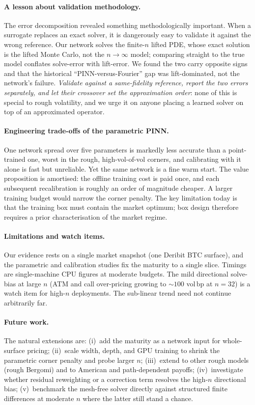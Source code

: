 \documentclass[review,12pt]{elsarticle}
\newcommand{\bp}{\ensuremath{\,\mathrm{bp}}}
\begin{document}
\paragraph{A lesson about validation methodology.}
The error decomposition revealed something methodologically important.  When a
surrogate replaces an exact solver, it is dangerously easy to validate it against
the wrong reference.  Our network solves the finite-$n$ lifted PDE, whose exact
solution is the lifted Monte Carlo, not the $n\to\infty$ model; comparing straight
to the true model conflates solve-error with lift-error.  We found the two carry
opposite signs and that the historical ``PINN-versus-Fourier'' gap was
lift-dominated, not the network's failure.  \emph{Validate against a
same-fidelity reference, report the two errors separately, and let their crossover
set the approximation order}: none of this is special to rough volatility, and we
urge it on anyone placing a learned solver on top of an approximated operator.

\paragraph{Engineering trade-offs of the parametric PINN.}
One network spread over five parameters is markedly less accurate than a
point-trained one, worst in the rough, high-vol-of-vol corners, and calibrating
with it alone is fast but unreliable.  Yet the same network is a fine warm start.
The value proposition is amortised: the offline training cost is paid once, and
each subsequent recalibration is roughly an order of magnitude cheaper.  A larger
training budget would narrow the corner penalty.  The key limitation today is that
the training box must contain the market optimum; box design therefore requires a
prior characterisation of the market regime.

\paragraph{Limitations and watch items.}
Our evidence rests on a single market snapshot (one Deribit BTC surface), and the
parametric and calibration studies fix the maturity to a single slice.  Timings
are single-machine CPU figures at moderate budgets.  The mild directional
solve-bias at large $n$ (ATM and call over-pricing growing to ${\sim}100$ vol\bp{}
at $n{=}32$) is a watch item for high-$n$ deployments.  The sub-linear trend need
not continue arbitrarily far.

\paragraph{Future work.}
The natural extensions are: (i)~add the maturity as a network input for whole-surface
pricing; (ii)~scale width, depth, and GPU training to shrink the parametric corner
penalty and probe larger $n$; (iii)~extend to other rough models (rough Bergomi)
and to American and path-dependent payoffs; (iv)~investigate whether residual
reweighting or a correction term resolves the high-$n$ directional bias;
(v)~benchmark the mesh-free solver directly against structured finite differences
at moderate $n$ where the latter still stand a chance.
\end{document}
